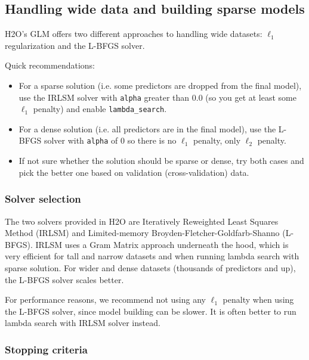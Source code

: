 \subsection{Handling wide data and building sparse models}

H2O's GLM offers two different approaches to handling wide datasets: $\ell_1$ regularization and the L-BFGS solver.

Quick recommendations:

\begin{itemize}
\item For a sparse solution (i.e. some predictors are dropped from the final model), use the IRLSM solver with 
      \texttt{alpha} greater than 0.0 (so you get at least some  $\ell_1$ penalty) and enable \texttt{lambda\_search}.

\item For a dense solution (i.e. all predictors are in the final model), use the L-BFGS solver with
      \texttt{alpha} of 0 so there is no  $\ell_1$ penalty, only  $\ell_2$ penalty.
\item If not sure whether the solution should be sparse or dense, try both cases and pick the better one based on validation (cross-validation) data.      
\end{itemize}

\subsubsection{Solver selection}

The two solvers provided in H2O are Iteratively Reweighted Least Squares Method (IRLSM) and Limited-memory Broyden-Fletcher-Goldfarb-Shanno (L-BFGS).  IRLSM uses
a Gram Matrix approach underneath the hood, which is very efficient for tall and narrow datasets and when running lambda search with sparse solution.  For wider and dense
datasets (thousands of predictors and up), the L-BFGS solver scales better. %

For performance reasons, we recommend not using any  $\ell_1$ penalty when using the L-BFGS solver, since
model building can be slower. It is often better to run lambda search with IRLSM solver instead.

\subsubsection{Stopping criteria}

